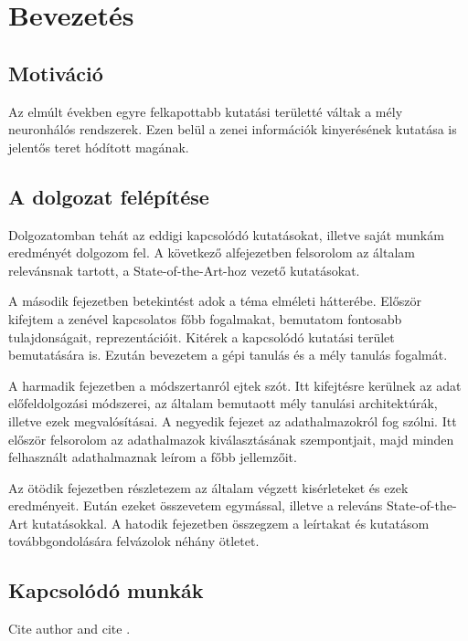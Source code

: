 \chapter{Bevezetés} %
\label{ch:intro}


\section{Motiváció}

Az elmúlt években egyre felkapottabb kutatási területté váltak a mély neuronhálós rendszerek. Ezen belül a zenei információk kinyerésének kutatása is jelentős teret hódított magának. 

\section{A dolgozat felépítése}

Dolgozatomban tehát az eddigi kapcsolódó kutatásokat, illetve saját munkám eredményét dolgozom fel. A következő alfejezetben felsorolom az általam relevánsnak tartott, a State-of-the-Art-hoz vezető kutatásokat. 

A második fejezetben betekintést adok a téma elméleti hátterébe. Először kifejtem a zenével kapcsolatos főbb fogalmakat, bemutatom fontosabb tulajdonságait, reprezentációit. Kitérek a kapcsolódó kutatási terület bemutatására is. Ezután bevezetem a gépi tanulás és a mély tanulás fogalmát. 

A harmadik fejezetben a módszertanról ejtek szót. Itt kifejtésre kerülnek az adat előfeldolgozási módszerei, az általam bemutaott mély tanulási architektúrák, illetve ezek megvalósításai. A negyedik fejezet az adathalmazokról fog szólni. Itt először felsorolom az adathalmazok kiválasztásának szempontjait, majd minden felhasznált adathalmaznak leírom a főbb jellemzőit. 

Az ötödik fejezetben részletezem az általam végzett kisérleteket és ezek eredményeit. Eután ezeket összevetem egymással, illetve a releváns State-of-the-Art kutatásokkal. A hatodik fejezetben összegzem a leírtakat és kutatásom továbbgondolására felvázolok néhány ötletet.


\section{Kapcsolódó munkák}

Cite author  \citeauthor{li2015automatic} and cite \cite{han2016deep}. 